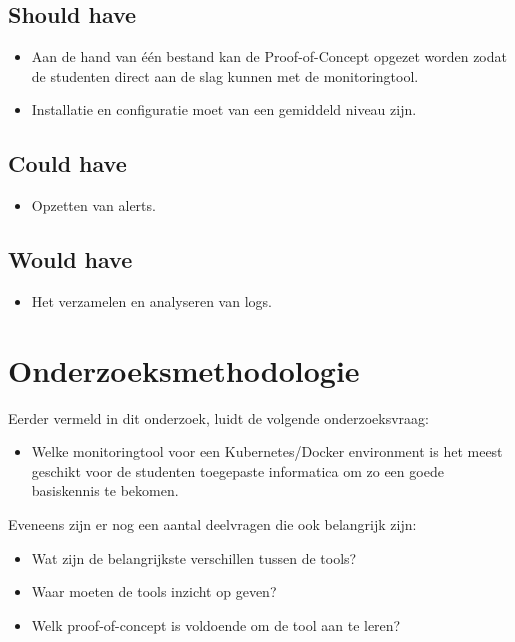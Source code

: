 \subsection{Should have}

\begin{itemize}
    \item Aan de hand van één bestand kan de Proof-of-Concept opgezet worden zodat de studenten direct aan de slag kunnen met de monitoringtool.
    \item Installatie en configuratie moet van een gemiddeld niveau zijn.
\end{itemize}

\subsection{Could have}

\begin{itemize}
    \item Opzetten van alerts.
\end{itemize}

\subsection{Would have}

\begin{itemize}
    \item Het verzamelen en analyseren van logs. 
\end{itemize}
\clearpage
\section{Onderzoeksmethodologie}

Eerder vermeld in dit onderzoek, luidt de volgende onderzoeksvraag:

\begin{itemize}
    \item Welke monitoringtool voor een Kubernetes/Docker environment is het meest geschikt voor de studenten toegepaste informatica om zo een goede basiskennis te bekomen.
\end{itemize}

Eveneens zijn er nog een aantal deelvragen die ook belangrijk zijn:

\begin{itemize}
    \item Wat zijn de belangrijkste verschillen tussen de tools?
    \item Waar moeten de tools inzicht op geven?
    \item Welk proof-of-concept is voldoende om de tool aan te leren?
\end{itemize}

